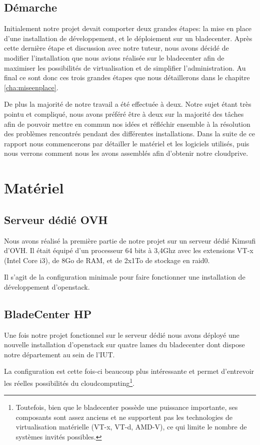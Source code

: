 \documentclass[a4paper,oneside]{report}
\begin{document}
\section{Démarche}
Initialement notre projet devait comporter deux grandes étapes: la mise en place d'une installation de développement, et le déploiement sur un \gls{bladecenter}. Après cette dernière étape et discussion avec notre tuteur, nous avons décidé de modifier l'installation que nous avions réalisée sur le \gls{bladecenter} afin de maximiser les possibilités de \gls{virtualisation} et de simplifier l'administration.\newline
Au final ce sont donc ces trois grandes étapes que nous détaillerons dans le chapitre \ref{cha:miseenplace}.

De plus la majorité de notre travail a été effectuée à deux.
Notre sujet étant très pointu et compliqué, nous avons préféré être à deux sur la majorité des tâches afin de pouvoir mettre en commun nos idées et réfléchir ensemble à la résolution des problèmes rencontrés pendant des différentes installations.
Dans la suite de ce rapport nous commencerons par détailler le matériel et les logiciels utilisés, puis nous verrons comment nous les avons assemblés afin d'obtenir notre \gls{cloudprive}.


\chapter{Matériel}

\section{Serveur dédié OVH}
Nous avons réalisé la première partie de notre projet sur un serveur dédié Kimsufi d'OVH.
Il était équipé d'un processeur 64 bits à 3,4Ghz avec les extensions VT-x (Intel Core i3), de 8Go de RAM, et de 2x1To de stockage en \gls{raid0}.

Il s'agit de la configuration minimale pour faire fonctionner une installation de développement d'\gls{openstack}.

\section{BladeCenter HP}
Une fois notre projet fonctionnel sur le serveur dédié nous avons déployé une nouvelle installation d'\gls{openstack} sur quatre lames du \gls{bladecenter} dont dispose notre département au sein de l'IUT.

La configuration est cette fois-ci beaucoup plus intéressante et permet d'entrevoir les réelles possibilités du \gls{cloudcomputing}\footnote{Toutefois, bien que le \gls{bladecenter} possède une puissance importante, ses composants sont assez anciens et ne supportent pas les technologies de \gls{virtualisation} matérielle (VT-x, VT-d, AMD-V), ce qui limite le nombre de systèmes invités possibles.}.
\end{document}
